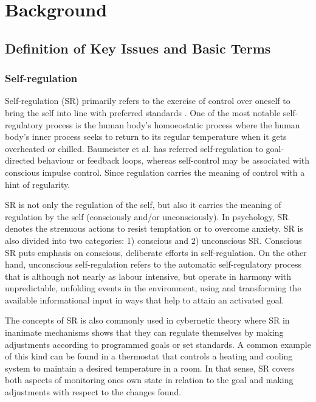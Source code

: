 \chapter{Background}
\section{Definition of Key Issues and Basic Terms}
\subsection{Self-regulation}
Self-regulation (SR) primarily refers to the exercise of control over oneself to bring the self into line with preferred standards \cite{Baumeister+2007}. One of the most notable self-regulatory process is the human body's homoeostatic process where the human body's inner process seeks to return to its regular temperature when it gets overheated or chilled. Baumeister et al. has referred self-regulation to goal-directed behaviour or feedback loops, whereas self-control may be associated with conscious impulse control. Since regulation carries  the meaning of  control with a hint of regularity.  

SR is not only the regulation of the self, but also it carries the meaning of regulation by the self (consciously and/or unconsciously). In psychology, SR denotes the strenuous actions to resist temptation or to overcome anxiety.  SR is also divided into two categories: 1) conscious and 2) unconscious SR.  Conscious SR puts emphasis on conscious, deliberate efforts in self-regulation. On the other hand, unconscious self-regulation refers to the automatic self-regulatory process  that is although not nearly as labour intensive, but operate in harmony with unpredictable, unfolding events in the environment, using and transforming the available informational input in ways that help to attain an activated goal.

The concepts of SR is also commonly used in cybernetic theory where SR in inanimate mechanisms shows that they can regulate themselves by making adjustments according to programmed goals or set standards. A common example of this kind can be found in a thermostat that controls a heating  and cooling system to maintain a desired temperature in a room. In that sense, SR covers both aspects of monitoring ones own state in relation to the goal and making adjustments with respect to the changes found. 

